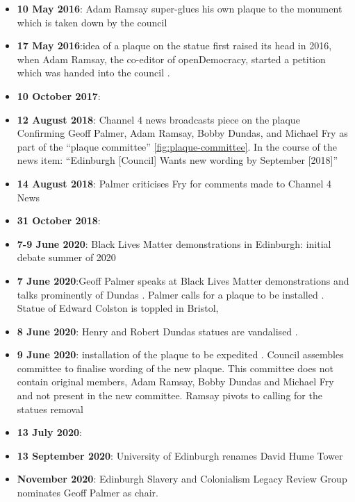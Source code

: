 \documentclass{scrartcl}
\renewcommand{\cite}{\parencite}
\providecommand{\tightlist}{%
  \setlength{\itemsep}{0pt}\setlength{\parskip}{0pt}}
\begin{document}
\begin{appendices}
\begin{itemize}
    \tightlist
    \item \textbf{10 May 2016}: Adam Ramsay super-glues his own plaque to the monument which is taken down by the council \cite[][]{ramsay_2016}
    \item \textbf{17 May 2016}:idea of a plaque on the statue first raised its head in 2016, when Adam Ramsay, the co-editor of openDemocracy, started a petition which was handed into the council \cite[][]{council_2016}.
    \item \textbf{10 October 2017}: \cite[][]{urquhart_2017}
    \item \textbf{12 August 2018}: Channel 4 news broadcasts piece on the plaque \cite[][]{c4n_2018} Confirming Geoff Palmer, Adam Ramsay, Bobby Dundas, and Michael Fry as part of the ``plaque committee'' \ref{fig:plaque-committee}. In the course of the news item: ``Edinburgh [Council] Wants new wording by September [2018]''
    \item \textbf{14 August 2018}: Palmer criticises Fry for comments made to Channel 4 News \cite[][]{logan_2018}
    \item \textbf{31 October 2018}: \cite[][]{bbc_2018}
    \item \textbf{7-9 June 2020}: Black Lives Matter demonstrations in Edinburgh: initial debate summer of 2020 \cite[][]{mccarthy_2022_1}
    \item \textbf{7 June 2020}:Geoff Palmer speaks at Black Lives Matter demonstrations and talks prominently of Dundas \cite[][]{hay_2020_3,youtube_2020,reporter_2020}. Palmer calls for a plaque to be installed \cite[][]{hay_2020_1}. Statue of Edward Colston is toppled in Bristol,   
    \item \textbf{8 June 2020}: Henry and Robert Dundas statues are vandalised \cite[][]{anderson_2021, hay_2020_3}. 
    \item   \textbf{9 June 2020}: installation of the plaque to be expedited \cite[][]{hoffman_2020, daily_2020}. Council assembles committee to finalise wording of the new plaque. This committee does not contain original members, Adam Ramsay, Bobby Dundas and Michael Fry and not present in the new committee. Ramsay pivots to calling for the statues removal \cite[][]{ramsay_2020} 
    \item \textbf{13 July 2020}: \cite[][]{council_2020}
    \item \textbf{13 September 2020}: University of Edinburgh renames David Hume Tower \cite[][]{uoe_2020,bbc_2020}
    \item \textbf{November 2020}: Edinburgh Slavery and Colonialism Legacy Review Group nominates Geoff Palmer as chair.

\end{itemize}
\end{appendices}
\end{document}
